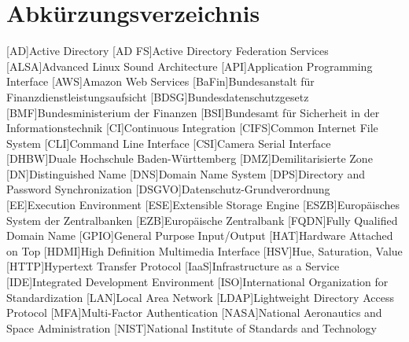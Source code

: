 
\chapter{Abkürzungsverzeichnis}
\begin{acronym}[WHATWG ]
\setlength{\itemsep}{-\parsep}
[AD]{Active Directory}
[AD FS]{Active Directory Federation Services}
[ALSA]{Advanced Linux Sound Architecture}
[API]{Application Programming Interface}
[AWS]{Amazon Web Services}
[BaFin]{Bundesanstalt für Finanzdienstleistungsaufsicht}
[BDSG]{Bundesdatenschutzgesetz}
[BMF]{Bundesministerium der Finanzen}
[BSI]{Bundesamt für Sicherheit in der Informationstechnik}
[CI]{Continuous Integration}
[CIFS]{Common Internet File System}
[CLI]{Command Line Interface}
[CSI]{Camera Serial Interface}
[DHBW]{Duale Hochschule Baden-Württemberg}
[DMZ]{Demilitarisierte Zone}
[DN]{Distinguished Name}
[DNS]{Domain Name System}
[DPS]{Directory and Password Synchronization}
[DSGVO]{Datenschutz-Grundverordnung}
[EE]{Execution Environment}
[ESE]{Extensible Storage Engine}
[ESZB]{Europäisches System der Zentralbanken}
[EZB]{Europäische Zentralbank}
[FQDN]{Fully Qualified Domain Name}
[GPIO]{General Purpose Input/Output}
[HAT]{Hardware Attached on Top}
[HDMI]{High Definition Multimedia Interface}
[HSV]{Hue, Saturation, Value}
[HTTP]{Hypertext Transfer Protocol}
[IaaS]{Infrastructure as a Service}
[IDE]{Integrated Development Environment}
[ISO]{International Organization for Standardization}
[LAN]{Local Area Network}
[LDAP]{Lightweight Directory Access Protocol}
[MFA]{Multi-Factor Authentication}
[NASA]{National Aeronautics and Space Administration}
[NIST]{National Institute of Standards and Technology}

\end{acronym}
